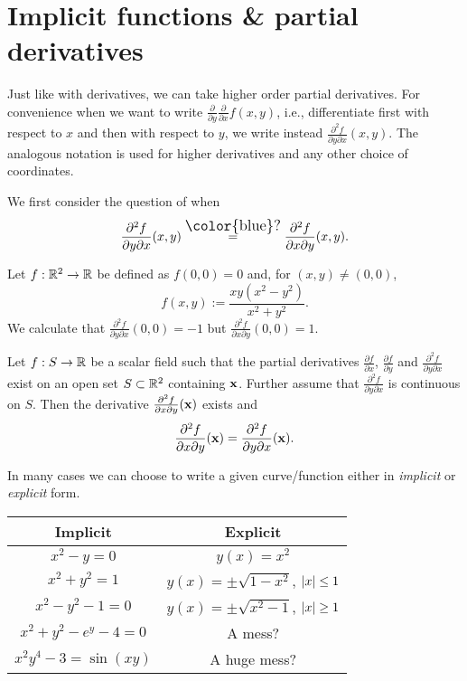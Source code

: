 \section{Implicit functions \& partial derivatives}

Just like with derivatives, we can take higher order partial derivatives.
For convenience when we want to write \(\frac{\partial}{\partial y}\frac{\partial}{\partial x}f(x,y) \), i.e., differentiate first with respect to \(x\) and then with respect to \(y\), we write instead \(\frac{\partial^2 f}{\partial y \partial x}(x,y) \).
The analogous notation is used for higher derivatives and any other choice of coordinates.

We first consider the question of when
\[
    \frac{\partial^2 f}{\partial y \partial x}(x,y)
    \overset{\text{\large\color{blue}?}}{=}
    \frac{\partial^2 f}{\partial x \partial y}(x,y).
\]

\begin{example*}
    Let \(f:\mathbb{R}^2 \to \mathbb{R}\) be defined as \(f(0,0)=0\) and, for \((x,y)\neq (0,0)\),
    \[
        f(x,y) := \frac{x y(x^2 - y^2)}{x^2 + y^2}.
    \]
    We calculate that \(\frac{\partial^2 f}{\partial y \partial x} (0,0) = -1\) but
    \(\frac{\partial^2 f}{\partial x \partial y}(0,0) = 1\).
\end{example*}

\begin{theorem}%
    \label{thm:equal-double-partial}
    Let \(f:S\to\mathbb{R}\) be a scalar field such that the partial derivatives \(\frac{\partial f}{\partial x }\), \(\frac{\partial f}{\partial y}\) and \(\frac{\partial^2 f}{\partial y \partial x} \) exist on an open set \(S\subset \mathbb{R}^2\) containing \(\mathbf{x}\).
    Further assume that \(\frac{\partial^2 f}{\partial y \partial x} \) is continuous on \(S\).
    Then the derivative \(\frac{\partial^2 f}{\partial x \partial y} (\mathbf{x})\) exists and
    \[
        \frac{\partial^2 f}{\partial x \partial y} (\mathbf{x})=\frac{\partial^2 f}{\partial y \partial x} (\mathbf{x}).
    \]
\end{theorem}

In many cases we can choose to write a given curve/function either in \emph{implicit} or \emph{explicit} form.

\begin{center}
    \begin{tabular}{c | c} %
        \textbf{Implicit}         & \textbf{Explicit}                              \\
        \midrule
        \(x^2-y=0\)               & \(y(x) = x^2\)                                 \\
        \(x^2+y^2=1\)             & \(y(x) = \pm \sqrt{1-x^2}\), \(\left|x\right|\leq 1\) \\
        \(x^2-y^2-1=0\)           & \(y(x) = \pm \sqrt{x^2-1}\), \(\left|x\right|\geq 1\) \\
        \(x^2+y^2-e^y -4 =0\)     & A mess?                                        \\
        \(x^2y^4 - 3 = \sin(xy)\) & A huge mess?
    \end{tabular}
\end{center}

